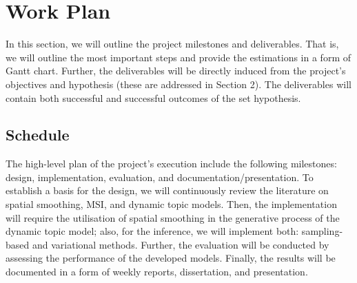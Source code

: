 \documentclass{mprop}
\begin{document}
\par

\par 

\par


\section{Work Plan}

\par In this section, we will outline the project milestones and deliverables. That is, we will outline the most important steps and provide the estimations in a form of Gantt chart. Further, the deliverables will be directly induced from the project's objectives and hypothesis (these are addressed in Section 2). The deliverables will contain both successful and successful outcomes of the set hypothesis.

\subsection{Schedule}

\par The high-level plan of the project's execution include the following milestones: design, implementation, evaluation, and documentation/presentation. To establish a basis for the design, we will continuously review the literature on spatial smoothing, MSI, and dynamic topic models. Then, the implementation will require the utilisation of spatial smoothing in the generative process of the dynamic topic model; also, for the inference, we will implement both: sampling-based and variational methods. Further, the evaluation will be conducted by assessing the performance of the developed models. Finally, the results will be documented in a form of weekly reports, dissertation, and presentation.
\end{document}
